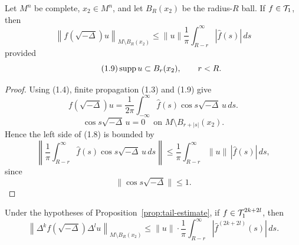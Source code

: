 \begin{proposition}
\label{prop:tail-estimate}

Let $M^n$ be complete, $x_2\in M^n$, and let $B_R(x_2)$ be the radius-$R$ ball.
If $f\in\mathcal{T}_1$, then
\begin{equation}\tag{1.8}
\left\| f(\sqrt{-\Delta})u \right\|_{M \setminus B_R(x_2)}
\leq \|u\| \frac{1}{\pi} \int_{R-r}^{\infty} |\hat{f}(s)|\, ds
\end{equation}
provided
\begin{equation}\tag{1.9}
\operatorname{supp} u \subset B_r(x_2), \qquad r < R.
\end{equation}
\end{proposition}

\begin{proof}
\sketch Using (1.4), finite propagation (1.3) and (1.9) give
\begin{equation}\tag{1.10}
f(\sqrt{-\Delta})u = \frac{1}{2\pi} \int_{-\infty}^{\infty} \hat{f}(s)\cos s\sqrt{-\Delta}\,u\,ds.
\end{equation}
\begin{equation}\tag{1.11}
\cos s\sqrt{-\Delta}\,u = 0 \quad \text{on } M \setminus B_{r+|s|}(x_2).
\end{equation}
Hence the left side of (1.8) is bounded by
\[
\left\| \frac{1}{\pi} \int_{R-r}^{\infty} \hat{f}(s)\cos s\sqrt{-\Delta}\,u\,ds \right\|
\leq \frac{1}{\pi} \int_{R-r}^{\infty} \|u\|\,|\hat{f}(s)|\,ds,
\]
since
\begin{equation}\tag{1.12}
\|\cos s\sqrt{-\Delta}\| \leq 1.
\end{equation}
\end{proof}

\begin{corollary}
\label{cor:derivative-tail-estimate}

Under the hypotheses of Proposition~\ref{prop:tail-estimate}, if $f\in\mathcal{T}_1^{2k+2l}$, then
\begin{equation}\tag{1.13}
\left\| \Delta^k f(\sqrt{-\Delta}) \Delta^l u \right\|_{M \setminus B_R(x_2)}
\leq \|u\| \cdot \frac{1}{\pi} \int_{R-r}^{\infty} \left|\hat{f}^{(2k+2l)}(s)\right|\, ds.
\end{equation}
\end{corollary}

